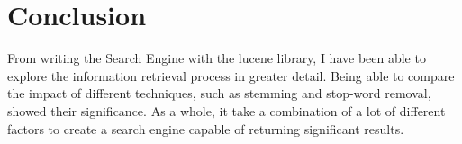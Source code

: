 \documentclass{article}
\begin{document}
\section{Conclusion}
From writing the Search Engine with the lucene library, I have been able to explore the information retrieval process in greater detail. Being able to compare the impact of different techniques, such as stemming and stop-word removal, showed their significance. As a whole, it take a combination of a lot of different factors to create a search engine capable of returning significant results.
  
\end{document}
